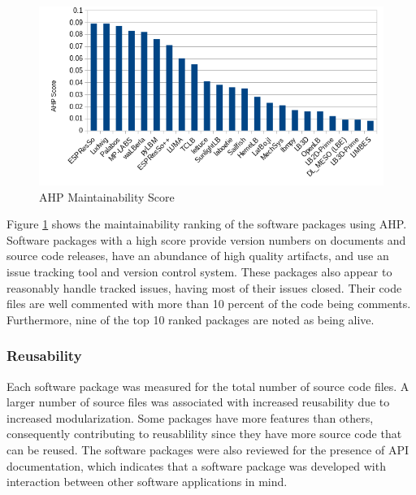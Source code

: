 \documentclass[12pt, notitlepage]{article}
\begin{document}
\begin{figure}[h!]
	\begin{center}
		\includegraphics[width=1.0\textwidth]{maintainability_chart}
		\caption{AHP Maintainability Score}
		\label{Fig_Maintainability}
	\end{center}
\end{figure}

Figure \ref{Fig_Maintainability} shows the maintainability ranking of the software packages using AHP. Software packages with a high score provide version numbers on documents and source code releases, have an abundance of high quality artifacts, and use an issue tracking tool and version control system. These packages also appear to reasonably handle tracked issues, having most of their issues closed. Their code files are well commented with more than 10 percent of the code being comments. Furthermore, nine of the top 10 ranked packages are noted as being alive. 

\subsubsection{Reusability}\label{reusabilityresults}

Each software package was measured for the total number of source code files. A larger number of source files was associated with increased reusability due to increased modularization. Some packages have more features than others, consequently contributing to reusablility since they have more source code that can be reused. The software packages were also reviewed for the presence of API documentation, which indicates that a software package was developed with interaction between other software applications in mind. 
\end{document}
